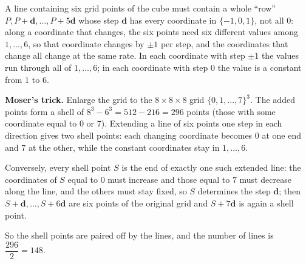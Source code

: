 A line containing six grid points of the cube must contain a whole ``row'' $P,P+\mathbf d,\dots,P+5\mathbf d$ whose step $\mathbf d$ has every coordinate in $\{-1,0,1\}$, not all $0$: along a coordinate that changes, the six points need six different values among $1,\dots,6$, so that coordinate changes by $\pm1$ per step, and the coordinates that change all change at the same rate. In each coordinate with step $\pm1$ the values run through all of $1,\dots,6$; in each coordinate with step $0$ the value is a constant from $1$ to $6$.

\textbf{Moser's trick.} Enlarge the grid to the $8\times8\times8$ grid $\{0,1,\dots,7\}^3$. The added points form a shell of $8^3-6^3=512-216=296$ points (those with some coordinate equal to $0$ or $7$). Extending a line of six points one step in each direction gives two shell points: each changing coordinate becomes $0$ at one end and $7$ at the other, while the constant coordinates stay in $1,\dots,6$.

Conversely, every shell point $S$ is the end of exactly one such extended line: the coordinates of $S$ equal to $0$ must increase and those equal to $7$ must decrease along the line, and the others must stay fixed, so $S$ determines the step $\mathbf d$; then $S+\mathbf d,\dots,S+6\mathbf d$ are six points of the original grid and $S+7\mathbf d$ is again a shell point.

So the shell points are paired off by the lines, and the number of lines is $\dfrac{296}{2}=\boxed{148}$.
